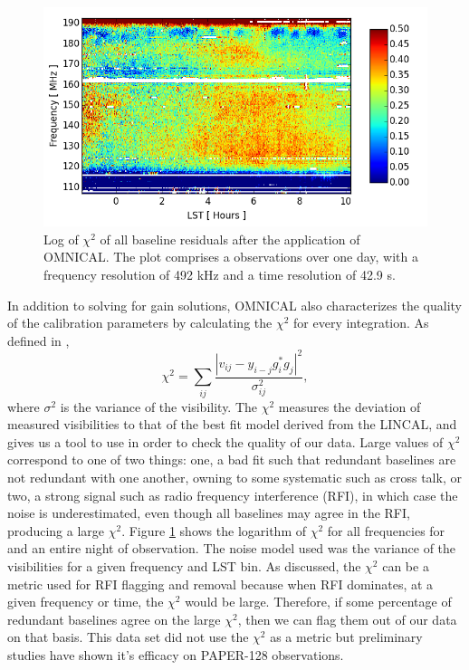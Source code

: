 \documentclass[twocolumn,numberedappendix]{emulateapj} \shorttitle{PSA64}
\begin{document}
\begin{figure}
\centering
\includegraphics[width=\columnwidth]{plots/chi2.png}
\caption{
Log of $\chi^{2}$ of all baseline residuals after the application of OMNICAL.
The plot comprises a observations over one day, with a frequency resolution of
492 kHz and a time resolution of 42.9 s.
} \label{fig:chi2}
\end{figure}

In addition to solving for gain solutions, OMNICAL also characterizes the
quality of the calibration parameters by calculating the $\chi^{2}$ for every
integration. As defined in \cite{zheng_et_al2014}, 
\begin{equation}\label{eqn:chi2}
    \chi^{2} = \sum_{ij}\frac{|v_{ij} - y_{i-j}g^{\ast}_{i}g_{j}|^{2}}{\sigma^{2}_{ij}},
\end{equation}
where $\sigma^{2}$ is the variance of the visibility. The $\chi^{2}$
measures the deviation of measured visibilities to that of the best fit model
derived from the LINCAL, and gives us a tool to use in order to check the
quality of our data. Large values of $\chi^{2}$ correspond to one of two things: one, a bad fit such that redundant baselines are not redundant with one another, owning to some systematic such as cross talk, or two, a strong signal such as radio frequency interference (RFI), in which case the noise is underestimated, even though all baselines may agree in the RFI, producing a large $\chi^{2}$. Figure
\ref{fig:chi2} shows the logarithm of $\chi^{2}$ for all frequencies for and an entire
night of observation. The noise model used was the variance of the visibilities for
a given frequency and LST bin. As discussed, the $\chi^{2}$ can be a metric used for RFI
flagging and removal because when RFI dominates, at a given frequency or time,
the $\chi^{2}$ would be large. Therefore, if some percentage of redundant
baselines agree on the large $\chi^{2}$, then we can flag them out of our data
on that basis. This data set did not use the $\chi^{2}$ as a metric but
preliminary studies have shown it's efficacy on PAPER-128 observations.
\end{document}
